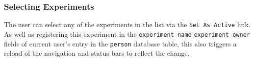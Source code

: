 \subsubsection{Selecting Experiments}
The user can select any of the experiments in the list via the \texttt{Set As Active} link. As well as registering this experiment in the \texttt{experiment\_name} \texttt{experiment\_owner} fields of current user's entry in the \texttt{person} database table, this also triggers a reload of the navigation and status bars to reflect the change. 
















